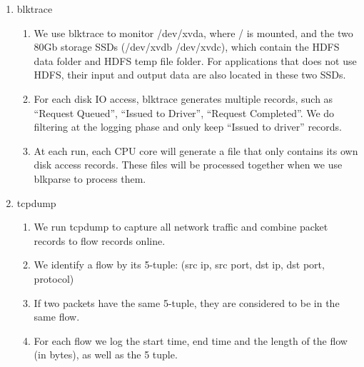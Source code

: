 \begin{enumerate}
\begin{enumerate}
    \item blktrace
        \begin{enumerate}
        \item We use blktrace to monitor /dev/xvda, where / is mounted, and the two 80Gb storage SSDs (/dev/xvdb /dev/xvdc), which contain the HDFS data folder and HDFS temp file folder. For applications that does not use HDFS, their input and output data are also located in these two SSDs.
        \item For each disk IO access, blktrace generates multiple records, such as ``Request Queued'', ``Issued to Driver'', ``Request Completed''. We do filtering at the logging phase and only keep ``Issued to driver'' records.
        \item At each run, each CPU core will generate a file that only contains its own disk access records. These files will be processed together when we use blkparse to process them.
        \end{enumerate}

    \item tcpdump
        \begin{enumerate}
        \item We run tcpdump to capture all network traffic and combine packet records to flow records online.
        \item We identify a flow by its 5-tuple: (src ip, src port, dst ip, dst port, protocol)
        \item If two packets have the same 5-tuple, they are considered to be in the same flow.
        \item For each flow we log the start time, end time and the length of the flow (in bytes), as well as the 5 tuple.
        \end{enumerate}
    
    \end{enumerate}

\end{enumerate}

